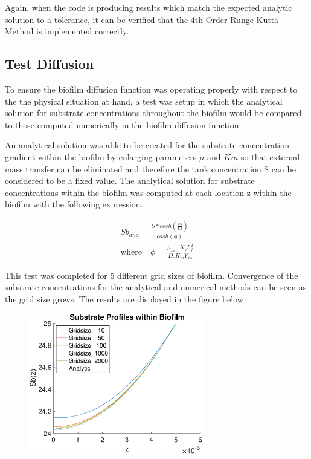 \documentclass[letterpaper, twoside]{article}
\numberwithin{equation}{section}
\begin{document}
Again, when the code is producing results which match the expected analytic solution to a tolerance, it can be verified that the 4th Order Runge-Kutta Method is implemented correctly.

\subsection{Test Diffusion}
To ensure the biofilm diffusion function was operating properly with respect to the the physical situation at hand, a test was setup in which the analytical solution for substrate concentrations throughout the biofilm would be compared to those computed numerically in the biofilm diffusion function.

An analytical solution was able to be created for the substrate concentration gradient within the biofilm by enlarging parameters $\mu$ and $Km$ so that external mass transfer can be eliminated and therefore the tank concentration S can be considered to be a fixed value. The analytical solution for substrate concentrations within the biofilm was computed at each location z within the biofilm with the following expression.

\begin{align}
{Sb_{ana}}=\frac{S*{cosh(\frac{{\phi}{z}}{Lf})}}{cosh(\phi)}\\
\text{where}{\quad} {\phi}=\frac{\mu_{max}{X_b}{L_f^{2}}}{{D_e}{K_m}{Y_{xs}}}
\end{align}

This test was completed for 5 different grid sizes of biofilm. Convergence of the substrate concentrations for the analytical and numerical methods can be seen as the grid size grows. The results are displayed in the figure below

\begin{figure}[H]
  \centering
  \includegraphics[read=eps, width=3in]{BiofilmDiffusion_Figure1.eps}
\end{figure}
\end{document}
